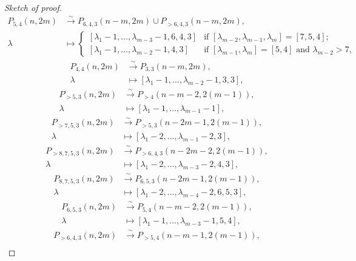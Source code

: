 \documentclass[a4paper, 12pt, reqno]{amsart}
\theoremstyle{remark}
\numberwithin{equation}{subsection}
\begin{document}
\begin{proof}[Sketch of proof]
\begin{align*}
    P_{5, 4}(n, 2m) &\xrightarrow{\sim} P_{6, 4, 3}(n - m, 2m) \cup P_{>6, 4, 3}(n - m, 2m), \\
    \lambda &\mapsto
              \begin{cases}
                [\lambda_1 - 1, \dots, \lambda_{m - 3} - 1, 6, 4, 3] &\text{if }[\lambda_{m - 2}, \lambda_{m - 1}, \lambda_m] = [7, 5, 4]; \\
                [\lambda_1 - 1, \dots, \lambda_{m - 2} - 1, 4, 3] &\text{if }[\lambda_{m - 1}, \lambda_m] = [5, 4]\text{ and }\lambda_{m - 2} > 7,
              \end{cases}
  \end{align*}
  \begin{align*}
    P_{4, 4}(n, 2m) &\xrightarrow{\sim} P_{3, 3}(n - m, 2m), \\
    \lambda &\mapsto [\lambda_1 - 1, \dots, \lambda_{m - 2} - 1, 3, 3],
  \end{align*}
  \begin{align*}
    P_{>5, 3}(n, 2m) &\xrightarrow{\sim} P_{>4}(n - m - 2, 2(m - 1)), \\
    \lambda &\mapsto [\lambda_1 - 1, \dots, \lambda_{m - 1} - 1],
  \end{align*}
  \begin{align*}
    P_{>7, 5, 3}(n, 2m) &\xrightarrow{\sim} P_{>5, 3}(n - 2m - 1, 2(m - 1)), \\
    \lambda &\mapsto [\lambda_1 - 2, \dots, \lambda_{m - 1} - 2, 3],
  \end{align*}
  \begin{align*}
    P_{>8, 7, 5, 3}(n, 2m) &\xrightarrow{\sim} P_{>6, 4, 3}(n - 2m - 2, 2(m - 1)), \\
    \lambda &\mapsto [\lambda_1 - 2, \dots, \lambda_{m - 3} - 2, 4, 3],
  \end{align*}
  \begin{align*}
    P_{8, 7, 5, 3}(n, 2m) &\xrightarrow{\sim} P_{6, 5, 3}(n - 2m - 1, 2(m - 1)), \\
    \lambda &\mapsto [\lambda_1 - 2, \dots, \lambda_{m - 4} - 2, 6, 5, 3],
  \end{align*}
  \begin{align*}
    P_{6, 5, 3}(n, 2m) &\xrightarrow{\sim} P_{5, 4}(n - m - 2, 2(m - 1)), \\
    \lambda &\mapsto [\lambda_1 - 1, \dots, \lambda_{m - 3} - 1, 5, 4],
  \end{align*}
  \begin{align*}
    P_{>6, 4, 3}(n, 2m) &\xrightarrow{\sim} P_{>5, 4}(n - m - 1, 2(m - 1)), \\

\end{align*}
\end{proof}
\end{document}
